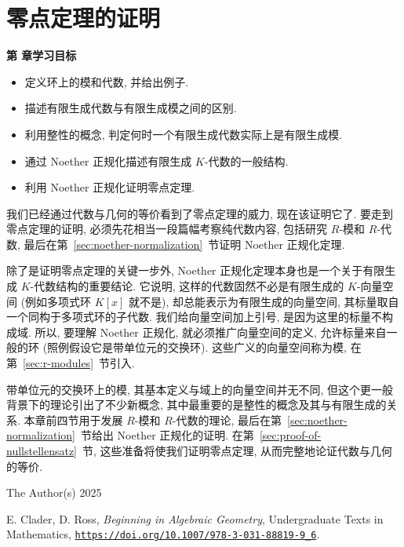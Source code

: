 \chapter{零点定理的证明}\label{chap:nullstellensatz-proof}

\noindent\textbf{第 \thechapter{} 章学习目标}
\begin{itemize}
  \item 定义环上的模和代数, 并给出例子.
  \item 描述有限生成代数与有限生成模之间的区别.
  \item 利用整性的概念, 判定何时一个有限生成代数实际上是有限生成模.
  \item 通过 Noether 正规化描述有限生成 $K$-代数的一般结构.
  \item 利用 Noether 正规化证明零点定理.
\end{itemize}

我们已经通过代数与几何的等价看到了零点定理的威力, 现在该证明它了. 要走到零点定理的证明, 必须先花相当一段篇幅考察纯代数内容, 包括研究 $R$-模和 $R$-代数, 最后在第~\ref{sec:noether-normalization}~节证明 Noether 正规化定理.

除了是证明零点定理的关键一步外, Noether 正规化定理本身也是一个关于有限生成 $K$-代数结构的重要结论. 它说明, 这样的代数固然不必是有限生成的 $K$-向量空间 (例如多项式环 $K[x]$ 就不是), 却总能表示为有限生成的\textquotedbl{}向量空间\textquotedbl{}, 其标量取自一个同构于多项式环的子代数. 我们给\textquotedbl{}向量空间\textquotedbl{}加上引号, 是因为这里的标量不构成域. 所以, 要理解 Noether 正规化, 就必须推广向量空间的定义, 允许标量来自一般的环 (照例假设它是带单位元的交换环). 这些广义的向量空间称为模, 在第~\ref{sec:r-modules}~节引入.

带单位元的交换环上的模, 其基本定义与域上的向量空间并无不同, 但这个更一般背景下的理论引出了不少新概念, 其中最重要的是整性的概念及其与有限生成的关系. 本章前四节用于发展 $R$-模和 $R$-代数的理论, 最后在第~\ref{sec:noether-normalization}~节给出 Noether 正规化的证明. 在第~\ref{sec:proof-of-nullstellensatz}~节, 这些准备将使我们证明零点定理, 从而完整地论证代数与几何的等价.

\par\smallskip
{\footnotesize
\noindent\textcopyright{} The Author(s) 2025\par
\noindent E. Clader, D. Ross, \emph{Beginning in Algebraic Geometry}, Undergraduate Texts in Mathematics,
\href{https://doi.org/10.1007/978-3-031-88819-9_6}{\nolinkurl{https://doi.org/10.1007/978-3-031-88819-9_6}}.\par}
